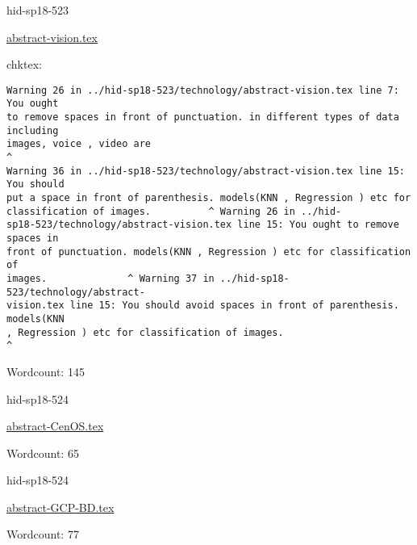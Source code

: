 \begin{IU}

hid-sp18-523

\href{https://github.com/cloudmesh-community/hid-sp18-523/blob/master//technology/abstract-vision.tex}{abstract-vision.tex}

 
chktex:
\begin{tiny}
\begin{verbatim}
Warning 26 in ../hid-sp18-523/technology/abstract-vision.tex line 7: You ought
to remove spaces in front of punctuation. in different types of data including
images, voice , video are                                                      ^
Warning 36 in ../hid-sp18-523/technology/abstract-vision.tex line 15: You should
put a space in front of parenthesis. models(KNN , Regression ) etc for
classification of images.          ^ Warning 26 in ../hid-
sp18-523/technology/abstract-vision.tex line 15: You ought to remove spaces in
front of punctuation. models(KNN , Regression ) etc for classification of
images.              ^ Warning 37 in ../hid-sp18-523/technology/abstract-
vision.tex line 15: You should avoid spaces in front of parenthesis. models(KNN
, Regression ) etc for classification of images.                            ^
\end{verbatim}
\end{tiny}

Wordcount: 145

\end{IU}



\begin{IU}

hid-sp18-524

\href{https://github.com/cloudmesh-community/hid-sp18-524/blob/master//technology/abstract-CenOS.tex}{abstract-CenOS.tex}

 

Wordcount: 65

\end{IU}



\begin{IU}

hid-sp18-524

\href{https://github.com/cloudmesh-community/hid-sp18-524/blob/master//technology/abstract-GCP-BD.tex}{abstract-GCP-BD.tex}

 

Wordcount: 77

\end{IU}


